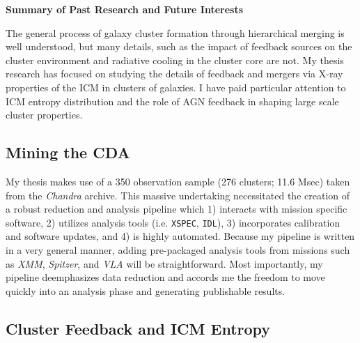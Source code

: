 \documentclass[11pt]{article}
\begin{document}
\begin{center}
\textbf{Summary of Past Research and Future Interests}\\
\end{center}

The general process of galaxy cluster formation through hierarchical
merging is well understood, but many details, such as the impact of
feedback sources on the cluster environment and radiative cooling in
the cluster core are not. My thesis research has focused on studying
the details of feedback and mergers via X-ray properties of the ICM in
clusters of galaxies. I have paid particular attention to ICM entropy
distribution and the role of AGN feedback in shaping large scale
cluster properties.

\subsection*{Mining the CDA}

My thesis makes use of a 350 observation sample (276 clusters; 11.6
Msec) taken from the {\it Chandra} archive. This massive
undertaking necessitated the creation of a robust reduction and
analysis pipeline which 1) interacts with mission specific software,
2) utilizes analysis tools (i.e. {\tt{XSPEC}}, {\tt{IDL}}), 3)
incorporates calibration and software updates, and 4) is highly
automated. Because my pipeline is written in a very general manner,
adding pre-packaged analysis tools from missions such as
{\textit{XMM}}, {\textit{Spitzer}}, and {\textit{VLA}} will be
straightforward. Most importantly, my pipeline deemphasizes data
reduction and accords me the freedom to move quickly into an analysis
phase and generating publishable results.

\subsection*{Cluster Feedback and ICM Entropy}
\end{document}
